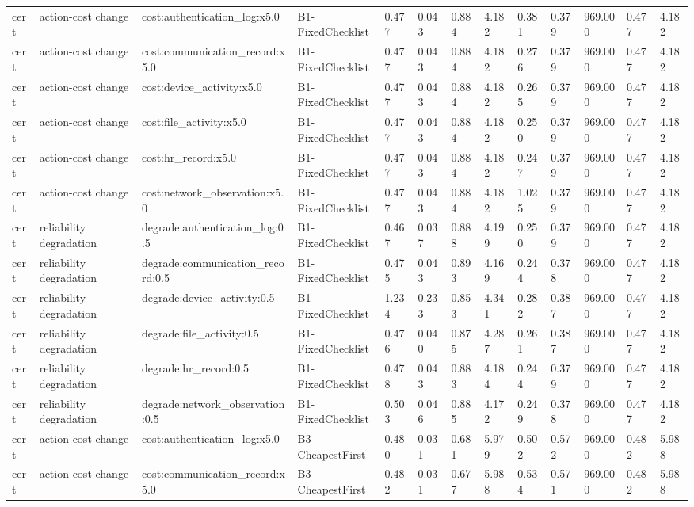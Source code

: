 \begin{table}[!ht]
{\begin{tabular}{lllllllllllll}
cert & action-cost change & cost:authentication\_log:x5.0 & B1-FixedChecklist & 0.477 & 0.043 & 0.884 & 4.182 & 0.381 & 0.379 & 969.000 & 0.477 & 4.182 \\
cert & action-cost change & cost:communication\_record:x5.0 & B1-FixedChecklist & 0.477 & 0.043 & 0.884 & 4.182 & 0.276 & 0.379 & 969.000 & 0.477 & 4.182 \\
cert & action-cost change & cost:device\_activity:x5.0 & B1-FixedChecklist & 0.477 & 0.043 & 0.884 & 4.182 & 0.265 & 0.379 & 969.000 & 0.477 & 4.182 \\
cert & action-cost change & cost:file\_activity:x5.0 & B1-FixedChecklist & 0.477 & 0.043 & 0.884 & 4.182 & 0.250 & 0.379 & 969.000 & 0.477 & 4.182 \\
cert & action-cost change & cost:hr\_record:x5.0 & B1-FixedChecklist & 0.477 & 0.043 & 0.884 & 4.182 & 0.247 & 0.379 & 969.000 & 0.477 & 4.182 \\
cert & action-cost change & cost:network\_observation:x5.0 & B1-FixedChecklist & 0.477 & 0.043 & 0.884 & 4.182 & 1.025 & 0.379 & 969.000 & 0.477 & 4.182 \\
cert & reliability degradation & degrade:authentication\_log:0.5 & B1-FixedChecklist & 0.467 & 0.037 & 0.888 & 4.199 & 0.250 & 0.379 & 969.000 & 0.477 & 4.182 \\
cert & reliability degradation & degrade:communication\_record:0.5 & B1-FixedChecklist & 0.475 & 0.043 & 0.893 & 4.169 & 0.244 & 0.378 & 969.000 & 0.477 & 4.182 \\
cert & reliability degradation & degrade:device\_activity:0.5 & B1-FixedChecklist & 1.234 & 0.233 & 0.853 & 4.341 & 0.282 & 0.387 & 969.000 & 0.477 & 4.182 \\
cert & reliability degradation & degrade:file\_activity:0.5 & B1-FixedChecklist & 0.476 & 0.040 & 0.875 & 4.287 & 0.261 & 0.387 & 969.000 & 0.477 & 4.182 \\
cert & reliability degradation & degrade:hr\_record:0.5 & B1-FixedChecklist & 0.478 & 0.043 & 0.883 & 4.184 & 0.244 & 0.379 & 969.000 & 0.477 & 4.182 \\
cert & reliability degradation & degrade:network\_observation:0.5 & B1-FixedChecklist & 0.503 & 0.046 & 0.885 & 4.172 & 0.249 & 0.378 & 969.000 & 0.477 & 4.182 \\
cert & action-cost change & cost:authentication\_log:x5.0 & B3-CheapestFirst & 0.480 & 0.031 & 0.681 & 5.979 & 0.502 & 0.572 & 969.000 & 0.482 & 5.988 \\
cert & action-cost change & cost:communication\_record:x5.0 & B3-CheapestFirst & 0.482 & 0.031 & 0.677 & 5.988 & 0.534 & 0.571 & 969.000 & 0.482 & 5.988 \\

\end{tabular}}
\end{table}

